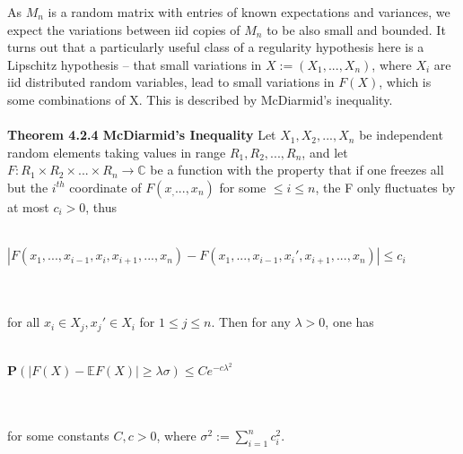 \documentclass{article}
\begin{document}
As $M_n$ is a random matrix with entries of known expectations and variances, we expect the variations between iid copies of $M_n$ to be also small and bounded. It turns out that a particularly useful class of a regularity hypothesis here is a Lipschitz hypothesis -- that small variations in $X := (X_1, ..., X_n)$, where $X_i$ are iid distributed random variables, lead to small variations in $F(X)$, which is some combinations of X. This is described by McDiarmid's inequality.\\
\\
\textbf{Theorem 4.2.4 McDiarmid's Inequality} Let $X_1, X_2, ..., X_n$ be independent random elements taking values in range $R_1, R_2, ..., R_n$, and let $F: R_1 \times R_2 \times ... \times R_n \rightarrow \mathbb{C}$ be a function with the property that if one freezes all but the $i^{th}$ coordinate of $F(x_, ..., x_n)$ for some $\leq i \leq n$, the F only fluctuates by at most $c_i > 0$, thus\\
\\
\centerline{$\left| F(x_1, ..., x_{i-1}, x_i, x_{i+1}, ..., x_n) - F(x_1, ..., x_{i-1}, x_i ', x_{i+1}, ... , x_n)\right| \leq c_i$}
\\
\\
for all $x_i \in X_j, x_j ' \in X_i$ for $1 \leq j \leq n$. Then for any $\lambda > 0$, one has \\
\\
\centerline{\textbf{P}$(\left| F(X) - \mathbb{E}F(X)\right| \geq \lambda\sigma) \leq C e^{-c\lambda^2}$}
\\
\\
for some constants $C, c > 0$, where $\sigma^2 := \sum\limits_{i=1}^n c_i^2$.\\
\end{document}
